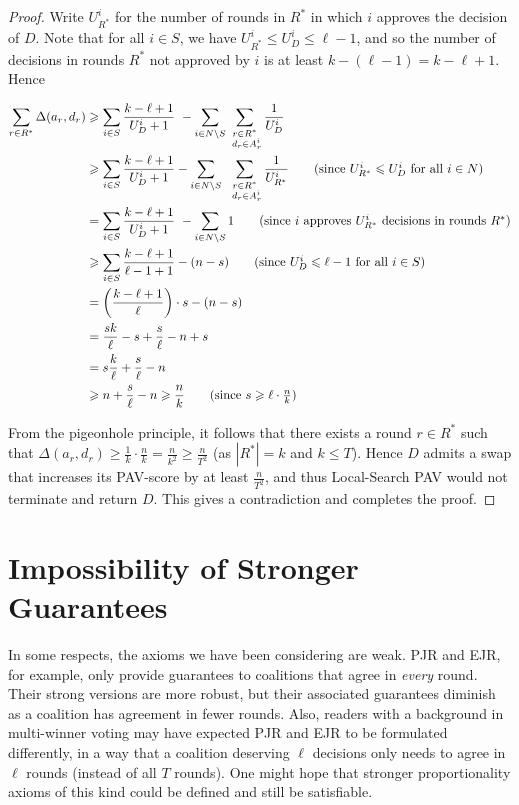 \documentclass[10pt]{scrartcl}
\theoremstyle{plain}
\theoremstyle{definition}
\renewcommand*{\le}{\leqslant}
\renewcommand*{\ge}{\geqslant}
\begin{document}
\begin{proof}
	Write $U^i_{R^*}$ for the number of rounds in $R^*$ in which $i$ approves the decision of $D$.
	Note that for all $i \in S$, we have $U^i_{R^*} \le U^i_D \le \ell - 1$, and so the number of decisions in rounds $R^*$ not approved by $i$ is at least $k - (\ell - 1) = k - \ell + 1$. Hence
	
	\begin{align*}
		\sum_{r \in R^*}\Delta(a_r, d_r) 
		&\ge  \sum_{i \in S} \frac{k - \ell + 1}{U^i_D + 1} \ - \sum_{i \in N \setminus S} \sum_{\substack{r \in R^*\\ \ d_r \in A^i_r}} \frac{1}{U^i_D}  \\
		&\ge  \sum_{i \in S} \frac{k - \ell + 1}{U^i_D + 1} - \sum_{i \in N \setminus S} \  \sum_{\substack{r \in R^*\\ \ d_r \in A^i_r}}  \frac{1}{U^i_{R^*}} 
		\tag{since $U^i_{R^*} \le U^i_D$ for all $i \in N$} \\
		&= \sum_{i \in S} \frac{k - \ell + 1}{U^i_D + 1} \  - \sum_{i \in N\setminus S} 1 
		\tag{since $i$ approves $U^i_{R^*}$ decisions in rounds $R^*$} \\
		&\ge \sum_{i \in S} \frac{k - \ell + 1}{\ell - 1 + 1} - (n - s) 
		\tag{since $U^i_D \le \ell - 1$ for all $i \in S$} \\ 
		&=  \bigg( \frac{k - \ell + 1}{\ell} \bigg) \cdot s -  (n - s)  \\
		&= \frac{sk}{\ell} - s + \frac{s}{\ell} - n + s \\
		&= s\frac{k}{\ell} + \frac{s}{\ell} - n \ \\
		&\ge n + \frac{s}{\ell} - n \ge \frac{n}{k} \tag{since $s \ge \ell \cdot \frac{n}{k}$}
	\end{align*}
	
	From the pigeonhole principle, it follows that there exists a round $r \in R^*$ such that $\Delta(a_r, d_r) \ge \frac{1}{k} \cdot \frac{n}{k} = \frac{n}{k^2} \ge \frac{n}{T^2}$ (as $|R^*| = k$ and $k \le T$). Hence $D$ admits a swap that increases its PAV-score by at least $\frac{n}{T^2}$, and thus Local-Search PAV would not terminate and return $D$. This gives a contradiction and completes the proof.
\end{proof}
 \section{Impossibility of Stronger Guarantees}
\label{sec:hardness}

In some respects, the axioms we have been considering are weak. PJR and EJR, for example, only provide guarantees to coalitions that agree in \emph{every} round. Their strong versions are more robust, but their associated guarantees diminish as a coalition has agreement in fewer rounds. Also, readers with a background in multi-winner voting may have expected PJR and EJR to be formulated differently, in a way that a coalition deserving $\ell$ decisions only needs to agree in $\ell$ rounds (instead of all $T$ rounds). One might hope that stronger proportionality axioms of this kind could be defined and still be satisfiable. 
\end{document}
